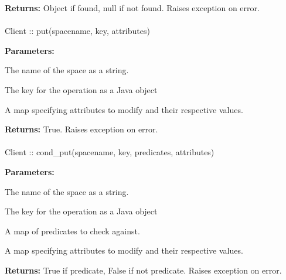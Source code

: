 \noindent\textbf{Returns:}
Object if found, null if not found.  Raises exception on error.

\paragraph{}
\label{api:java:put}
\begin{javacode}
Client :: put(spacename, key, attributes)
\end{javacode}


\noindent\textbf{Parameters:}
\begin{description}[labelindent=\widthof{{\code{attributes}}},leftmargin=*,noitemsep,nolistsep,align=right]
\item[\code{spacename}] The name of the space as a string.
\item[\code{key}] The key for the operation as a Java object
\item[\code{attributes}] A map specifying attributes to modify and their respective values.
\end{description}

\noindent\textbf{Returns:}
True.  Raises exception on error.

\paragraph{}
\label{api:java:cond_put}
\begin{javacode}
Client :: cond_put(spacename, key, predicates, attributes)
\end{javacode}


\noindent\textbf{Parameters:}
\begin{description}[labelindent=\widthof{{\code{predicates}}},leftmargin=*,noitemsep,nolistsep,align=right]
\item[\code{spacename}] The name of the space as a string.
\item[\code{key}] The key for the operation as a Java object
\item[\code{predicates}] A map of predicates to check against.
\item[\code{attributes}] A map specifying attributes to modify and their respective values.
\end{description}

\noindent\textbf{Returns:}
True if predicate, False if not predicate.  Raises exception on error.

